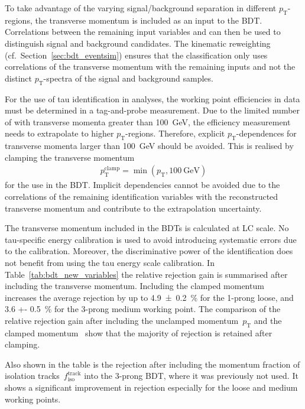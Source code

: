 To take advantage of the varying signal/background separation in different
$p_\text{T}$-regions, the \tauhadvis transverse momentum is included as an input
to the BDT. Correlations between the remaining input variables and \pt can then
be used to distinguish signal and background candidates. The kinematic
reweighting (cf.\ Section~\ref{sec:bdt_eventsim}) ensures that the
classification only uses correlations of the transverse momentum with the
remaining inputs and not the distinct $p_\text{T}$-spectra of the signal and
background samples.

For the use of tau identification in analyses, the working point efficiencies in
data must be determined in a tag-and-probe measurement. Due to the limited
number of \tauhadvis with transverse momenta greater than \SI{100}{\GeV}, the
efficiency measurement needs to extrapolate to higher $p_\text{T}$-regions.
Therefore, explicit $p_\text{T}$-dependences for transverse momenta larger than
\SI{100}{\GeV} should be avoided. This is realised by clamping the transverse
momentum
\begin{align*}
  p_\text{T}^\text{clamp} = \min(p_\text{T}, \SI{100}{\giga\electronvolt})
\end{align*}
for the use in the BDT. Implicit dependencies cannot be avoided due to the
correlations of the remaining identification variables with the reconstructed
transverse momentum and contribute to the extrapolation uncertainty.

The transverse momentum included in the BDTs is calculated at LC scale. No
tau-specific energy calibration is used to avoid introducing systematic errors
due to the calibration. Moreover, the discriminative power of the identification
does not benefit from using the tau energy scale calibration. In
Table~\ref{tab:bdt_new_variables} the relative rejection gain is summarised
after including the transverse momentum. Including the clamped
momentum~ increases the average rejection by up
to \SI{4.9 +- 0.2}{\percent} for the 1-prong loose, and \SI{3.6 +-
  0.5}{\percent} for the 3-prong medium working point. The comparison of the
relative rejection gain after including the unclamped momentum~$p_\text{T}$ and
the clamped momentum~ show that the majority of
rejection is retained after clamping.

Also shown in the table is the rejection after including the momentum fraction
of isolation tracks~$f_\text{iso}^\text{track}$ into the 3-prong BDT, where it
was previously not used. It shows a significant improvement in rejection
especially for the loose and medium working points.

